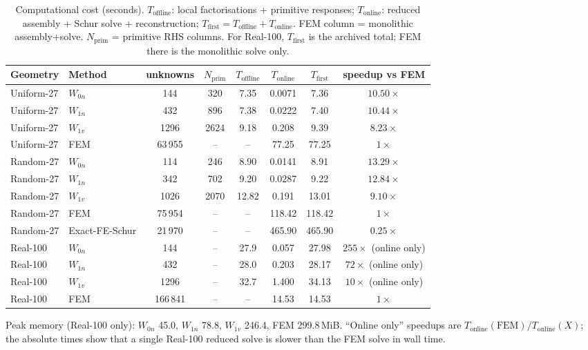 \documentclass[11pt,a4paper]{article}
\begin{document}
\begin{table}[t]
  \centering
  \small
  \caption{Computational cost (seconds).  $T_{\mathrm{offline}}$: local
    factorisations + primitive responses; $T_{\mathrm{online}}$:
    reduced assembly + Schur solve + reconstruction;
    $T_{\mathrm{first}} = T_{\mathrm{offline}}+T_{\mathrm{online}}$.
    FEM column = monolithic assembly+solve.  $N_{\mathrm{prim}}$ =
    primitive RHS columns.  For Real-100, $T_{\mathrm{first}}$ is the
    archived total; FEM there is the monolithic solve only.}
  \label{tab:cost}
  \begin{tabular}{llcccccc}
    \toprule
    Geometry & Method & unknowns & $N_{\mathrm{prim}}$ &
    $T_{\mathrm{offline}}$ & $T_{\mathrm{online}}$ &
    $T_{\mathrm{first}}$ & speedup vs FEM \\
    \midrule
    Uniform-27 & $W_{0n}$ & 144 & 320 & 7.35 & 0.0071 & 7.36 & $10.50\times$ \\
    Uniform-27 & $W_{1n}$ & 432 & 896 & 7.38 & 0.0222 & 7.40 & $10.44\times$ \\
    Uniform-27 & $W_{1v}$ & 1296 & 2624 & 9.18 & 0.208 & 9.39 & $8.23\times$ \\
    Uniform-27 & FEM & 63\,955 & -- & -- & 77.25 & 77.25 & $1\times$ \\
    \addlinespace[2pt]
    Random-27 & $W_{0n}$ & 114 & 246 & 8.90 & 0.0141 & 8.91 & $13.29\times$ \\
    Random-27 & $W_{1n}$ & 342 & 702 & 9.20 & 0.0287 & 9.22 & $12.84\times$ \\
    Random-27 & $W_{1v}$ & 1026 & 2070 & 12.82 & 0.191 & 13.01 & $9.10\times$ \\
    Random-27 & FEM & 75\,954 & -- & -- & 118.42 & 118.42 & $1\times$ \\
    Random-27 & Exact-FE-Schur & 21\,970 & -- & -- & 465.90 & 465.90 & $0.25\times$ \\
    \addlinespace[2pt]
    Real-100 & $W_{0n}$ & 144 & -- & 27.9 & 0.057 & 27.98 & $255\times$ (online only) \\
    Real-100 & $W_{1n}$ & 432 & -- & 28.0 & 0.203 & 28.17 & $72\times$ (online only) \\
    Real-100 & $W_{1v}$ & 1296 & -- & 32.7 & 1.400 & 34.13 & $10\times$ (online only) \\
    Real-100 & FEM & 166\,841 & -- & -- & 14.53 & 14.53 & $1\times$ \\
    \bottomrule
  \end{tabular}
  \medskip
  \raggedright\footnotesize
  Peak memory (Real-100 only): $W_{0n}$ 45.0, $W_{1n}$ 78.8,
  $W_{1v}$ 246.4, FEM 299.8\,MiB.  ``Online only'' speedups are
  $T_{\mathrm{online}}(\mathrm{FEM})/T_{\mathrm{online}}(X)$; the
  absolute times show that a single Real-100 reduced solve is slower
  than the FEM solve in wall time.
\end{table}
\end{document}
